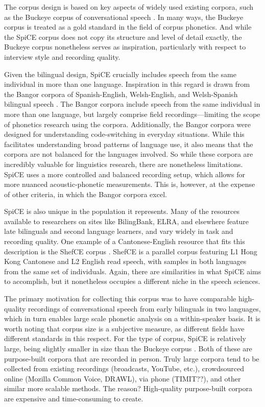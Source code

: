 The corpus design is based on key aspects of widely used existing corpora, such as the Buckeye corpus of conversational speech \citep{pitt_2005_buckeye}. In many ways, the Buckeye corpus is treated as a gold standard in the field of corpus phonetics. And while the SpiCE corpus does not copy its structure and level of detail exactly, the Buckeye corpus nonetheless serves as inspiration, particularly with respect to interview style and recording quality.

Given the bilingual design, SpiCE crucially includes speech from the same individual in more than one language. Inspiration in this regard is drawn from the Bangor corpora of Spanish-English, Welsh-English, and Welsh-Spanish bilingual speech \citep{deuchar_2014_corpora}. The Bangor corpora include speech from the same individual in more than one language, but largely comprise field recordings---limiting the scope of phonetics research using the corpora. Additionally, the Bangor corpora were designed for understanding code-switching in everyday situations. While this facilitates understanding broad patterns of language use, it also means that the corpora are not balanced for the languages involved. So while these corpora are incredibly valuable for linguistics research, there are nonetheless limitations. SpiCE uses a more controlled and balanced recording setup, which allows for more nuanced acoustic-phonetic measurements. This is, however, at the expense of other criteria, in which the Bangor corpora excel. 

SpiCE is also unique in the population it represents. Many of the resources available to researchers on sites like BilingBank, ELRA, and elsewhere feature late bilinguals and second language learners, and vary widely in task and recording quality. One example of a Cantonese-English resource that fits this description is the ShefCE corpus \citep{ng_shefce_2017}. ShefCE is a parallel corpus featuring L1 Hong Kong Cantonese and L2 English read speech, with samples in both languages from the same set of individuals. Again, there are similarities in what SpiCE aims to accomplish, but it nonetheless occupies a different niche in the speech sciences.

The primary motivation for collecting this corpus was to have comparable high-quality recordings of conversational speech from early bilinguals in two languages, which in turn enables large scale phonetic analysis on a within-speaker basis. It is worth noting that corpus size is a subjective measure, as different fields have different standards in this respect. For the type of corpus, SpiCE is relatively large, being slightly smaller in size than the Buckeye corpus \citep{pitt_2005_buckeye}. Both of these are purpose-built corpora that are recorded in person. Truly large corpora tend to be collected from existing recordings (broadcasts, YouTube, etc.), crowdsourced online (Mozilla Common Voice, DRAWL), via phone (TIMIT??), and other similar more scalable methods. The reason? High-quality purpose-built corpora are expensive and time-consuming to create.

